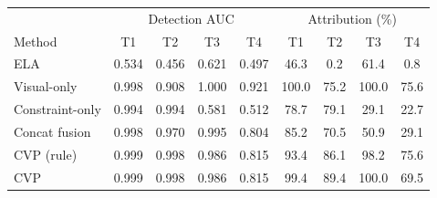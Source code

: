 \begin{tabular}{lcccc|cccc}
\toprule
 & \multicolumn{4}{c|}{Detection AUC} & \multicolumn{4}{c}{Attribution (\%)}\\
Method & T1 & T2 & T3 & T4 & T1 & T2 & T3 & T4\\
\midrule
ELA & 0.534 & 0.456 & 0.621 & 0.497 & 46.3 & 0.2 & 61.4 & 0.8\\
Visual-only & 0.998 & 0.908 & 1.000 & 0.921 & 100.0 & 75.2 & 100.0 & 75.6\\
Constraint-only & 0.994 & 0.994 & 0.581 & 0.512 & 78.7 & 79.1 & 29.1 & 22.7\\
Concat fusion & 0.998 & 0.970 & 0.995 & 0.804 & 85.2 & 70.5 & 50.9 & 29.1\\
CVP (rule) & 0.999 & 0.998 & 0.986 & 0.815 & 93.4 & 86.1 & 98.2 & 75.6\\
CVP & 0.999 & 0.998 & 0.986 & 0.815 & 99.4 & 89.4 & 100.0 & 69.5\\
\bottomrule
\end{tabular}
